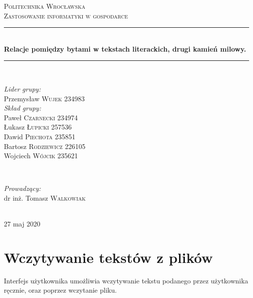 \documentclass[12pt,a4paper]{article} %
\begin{document}
\begin{titlepage}

\newcommand{\HRule}{\rule{\linewidth}{0.5mm}}

\center
 
\textsc{\LARGE Politechnika Wrocławska}\\[1.5cm] 
\textsc{\Large Zastosowanie informatyki w gospodarce}\\[0.5cm]

\HRule \\[0.5cm]
{ \huge \bfseries Relacje pomiędzy bytami w tekstach literackich, drugi kamień milowy.}\\[0.2cm]
\HRule \\[1.6cm]
 
 
\begin{minipage}{0.4\textwidth}
\begin{flushleft} \large
\emph{Lider grupy:}\\
Przemysław \textsc{Wujek} 234983\\
\emph{Skład grupy:}\\
Paweł \textsc{Czarnecki} 234974\\
Łukasz \textsc{Łupicki} 257536\\
Dawid \textsc{Piechota} 235851\\
Bartosz \textsc{Rodziewicz} 226105\\
Wojciech \textsc{Wójcik} 235621\\
\end{flushleft}
\end{minipage}
~
\begin{minipage}{0.4\textwidth}
\begin{flushright} \large
\emph{Prowadzący:} \\
dr inż. Tomasz \textsc{Walkowiak} 
\end{flushright}
\end{minipage}\\[4cm]

\vfill
{\large 27 maj 2020}

\end{titlepage}
   
\newpage

\section{Wczytywanie tekstów z plików}
    Interfejs użytkownika umożliwia wczytywanie tekstu podanego przez użytkownika ręcznie, oraz poprzez wczytanie pliku.
    
\end{document}
